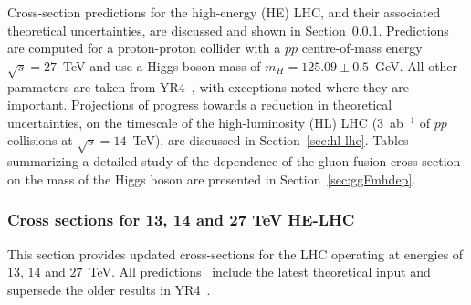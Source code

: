 \quad\quad\quad{}

 

Cross-section predictions for the high-energy (HE) LHC, and their associated theoretical uncertainties, are discussed and shown in
Section~\ref{sec:he-lhc}. Predictions are computed for a proton-proton collider with a $pp$ centre-of-mass
energy $\sqrt{s}=27$~TeV and use a Higgs
boson mass of $m_H=125.09 \pm 0.5$~GeV.   All other parameters are taken from YR4~\cite{deFlorian:2016spz},
with exceptions noted where they are important.  
Projections of progress towards a reduction in theoretical uncertainties, on the timescale
of the high-luminosity (HL) LHC (3~ab$^{-1}$ of $pp$ collisions at $\sqrt{s}=14$~TeV), are discussed in Section~\ref{sec:hl-lhc}. 
Tables summarizing a detailed study of the dependence of the gluon-fusion cross section on the mass of the Higgs boson
are presented in Section~\ref{sec:ggFmhdep}.

\subsubsection{Cross sections for 13, 14 and 27 TeV HE-LHC}
\label{sec:he-lhc}

This section provides updated cross-sections for the LHC operating at
energies of $13$, $14$ and $27$~TeV. All predictions~\cite{HXSWGwiki} include the latest 
theoretical input and supersede the older results in YR4~\cite{deFlorian:2016spz}.

